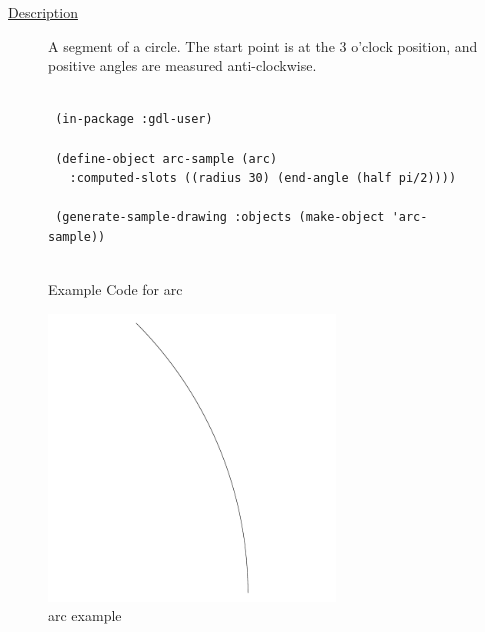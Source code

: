 \documentclass [11pt]{book}
\begin{document}
\begin{itemize}
\begin{description}
\item [
\underline{Description}]


A segment of a circle.
The start point is at the 3 o'clock position, and positive
angles are measured anti-clockwise.



\end{description}




\begin{figure}
\begin{lrbox}{\boxedverb}
\begin{minipage}{\linewidth}
{\small

\begin{verbatim}

 (in-package :gdl-user)

 (define-object arc-sample (arc) 
   :computed-slots ((radius 30) (end-angle (half pi/2))))

 (generate-sample-drawing :objects (make-object 'arc-sample))


\end{verbatim}}
\end{minipage}
\end{lrbox}
\fbox{\usebox{\boxedverb}}

\caption{Example Code for arc}

\label{fig:example-code-arc}

\end{figure}

\begin{figure}
\begin{center}
\includegraphics[width=3in,height=3in]{../images/example-arc.pdf}
\end{center}

\caption{arc example}


\end{figure}
\end{itemize}
\end{document}
